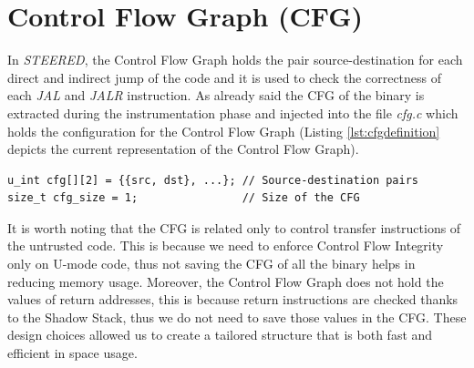 \section{Control Flow Graph (CFG)}
\label{sec:project_cfg}

In \textit{STEERED}, the Control Flow Graph holds the pair source-destination for
each direct and indirect jump of the code and it is used to check the correctness
of each \textit{JAL} and \textit{JALR} instruction. As already said the CFG of
the binary is extracted during the instrumentation phase and injected into the
file \textit{cfg.c} which holds the configuration for the Control Flow Graph (Listing
\ref{lst:cfgdefinition} depicts the current representation of the Control Flow
Graph). \\
\begin{lstlisting}[style=CStyle, caption= Definition of the Control Flow Graph inside \textit{cfg.c}, label={lst:cfgdefinition}]
u_int cfg[][2] = {{src, dst}, ...}; // Source-destination pairs
size_t cfg_size = 1;                // Size of the CFG
\end{lstlisting}

It is worth noting that the CFG is related only to control transfer instructions
of the untrusted code. This is because we need to enforce Control Flow Integrity
only on U-mode code, thus not saving the CFG of all the binary helps in reducing
memory usage. Moreover, the Control Flow Graph does not hold the values of return
addresses, this is because return instructions are checked thanks to the Shadow
Stack, thus we do not need to save those values in the CFG. These design choices
allowed us to create a tailored structure that is both fast and efficient in
space usage.

